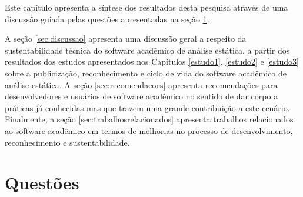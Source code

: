 \label{discussao}

Este capítulo apresenta 
a síntese dos resultados desta pesquisa através de uma
discussão guiada pelas questões apresentadas na seção \ref{discussao:questoes}.

A seção \ref{sec:discussao} apresenta 
uma discussão geral a respeito da
sustentabilidade técnica do software acadêmico de análise estática,
a partir dos resultados dos estudos apresentados nos Capítulos \ref{estudo1}, \ref{estudo2} e
\ref{estudo3} sobre a publicização, reconhecimento e ciclo de vida do software
acadêmico de análise estática.
A seção \ref{sec:recomendacoes} apresenta recomendações para desenvolvedores e usuários de software acadêmico no sentido de dar corpo a práticas já conhecidas mas que trazem uma grande contribuição a este cenário.
Finalmente, a seção \ref{sec:trabalhosrelacionados} apresenta trabalhos relacionados ao software acadêmico em termos de melhorias no processo de desenvolvimento, reconhecimento e sustentabilidade.

\section{Questões} \label{discussao:questoes}

\newcommand{\QuestaoUm}{
  Como evolui o reconhecimento ao software acadêmico de análise estática
  publicado nas conferências de Engenharia de Software ASE e SCAM?
}
\newcommand{\QuestaoDois}{
  A publicização do software acadêmico de análise estática publicado nas
  conferências de Engenharia de Software ASE e SCAM influencia o seu
  reconhecimento?
}
\newcommand{\QuestaoTres}{
  O ciclo de vida do software acadêmico de análise estática publicado nas
  conferências de Engenharia de Software ASE e SCAM influencia o seu
  reconhecimento?
}
\newcommand{\QuestaoQuatro}{
  Qual o tamanho do software acadêmico de análise estática publicado nas
  conferências de Engenharia de Software ASE e SCAM?
}
\newcommand{\QuestaoCinco}{
  Como evolui o tamanho do software acadêmico de análise estática publicado nas
  conferências de Engenharia de Software ASE e SCAM?
}
\newcommand{\QuestaoSeis}{
  É possível replicar ou reproduzir pesquisas que mencionam software
  acadêmico de análise estática publicado nas conferências de Engenharia de
  Software ASE e SCAM?
}
\newcommand{\QuestaoSete}{
  O software acadêmico de análise estática publicado nas conferências de
  Engenharia de Software ASE e SCAM é sustentável tecnicamente?
}
\newcommand{\QuestaoOito}{
  O software acadêmico de análise estática publicado nas conferências de
  Engenharia de Software ASE e SCAM é útil e maduro suficiente para ser
  utilizado em outras pesquisas?
}


